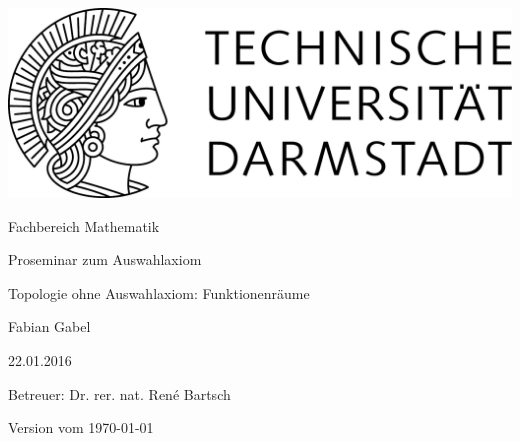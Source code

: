 \begin{titlepage}
  \begin{center}
    \vspace{1cm}
    \includegraphics[width=0.5\linewidth]{TU_Darmstadt_Logo.pdf}
    \vspace{12pt}
    
    \large{Fachbereich Mathematik}
    \vspace{2cm}
    
    \large{Proseminar zum Auswahlaxiom}
    \vspace{2cm}

    \huge{Topologie ohne Auswahlaxiom: Funktionenräume}
    \vspace*{2cm}    
    
		\large
    Fabian Gabel
    \vspace*{.5cm}

    22.01.2016 \\
    \vspace*{1cm}

    Betreuer: Dr. rer. nat. René Bartsch

    \vspace*{.5cm}

    \tiny{Version vom \today}
  \end{center}
\end{titlepage}
\vspace*{\fill}
